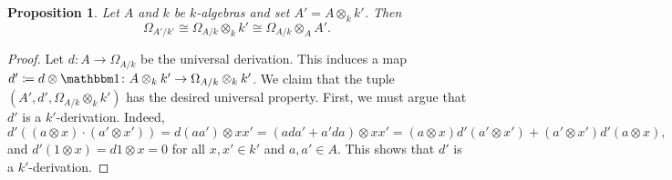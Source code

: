 \documentclass[10pt]{article}
\theoremstyle{thmstyle}
\newtheorem{proposition}[theorem]{Proposition}
\theoremstyle{defstyle}
\begin{document}
\begin{proposition}
    Let $A$ and $k$ be $k$-algebras and set $A' = A\otimes_k k'$. Then 
    \begin{equation*}
        \Omega_{A'/k'}\cong\Omega_{A/k}\otimes_k k'\cong\Omega_{A/k}\otimes_{A} A'.
    \end{equation*}
\end{proposition}
\begin{proof}
    Let $d\colon A\to\Omega_{A/k}$ be the universal derivation. This induces a map $d'\coloneq d\otimes\mathbbm 1\colon A\otimes_k k'\to \Omega_{A/k}\otimes_k k'$. We claim that the tuple $(A', d', \Omega_{A/k}\otimes_k k')$ has the desired universal property. First, we must argue that $d'$ is a $k'$-derivation. Indeed, 
    \begin{equation*}
        d'\left((a\otimes x)\cdot(a'\otimes x')\right) = d(aa')\otimes xx' = \left(ada' + a'da\right)\otimes xx' = (a\otimes x)d'(a'\otimes x') + (a'\otimes x')d'(a\otimes x),
    \end{equation*}
    and $d'(1\otimes x) = d1\otimes x = 0$ for all $x, x'\in k'$ and $a, a'\in A$. This shows that $d'$ is a $k'$-derivation.


\end{proof}
\end{document}

